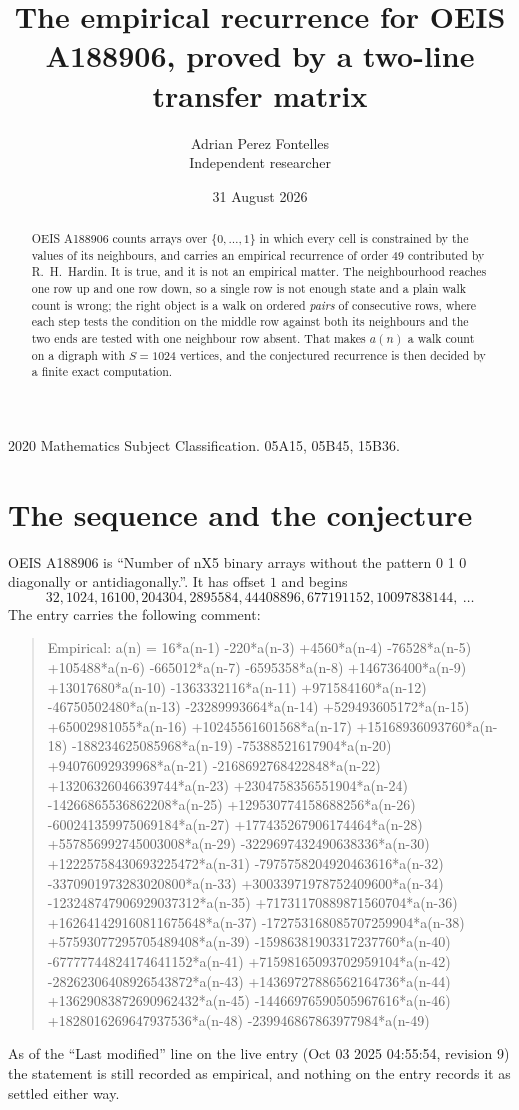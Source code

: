 \documentclass[11pt,a4paper]{article}
\title{The empirical recurrence for OEIS A188906, proved by a two-line transfer matrix}
\author{Adrian Perez Fontelles\\ \small Independent researcher}
\date{31 August 2026}
\theoremstyle{plain}
\theoremstyle{definition}
\begin{document}
\maketitle

\begin{abstract}
OEIS A188906 counts arrays over $\{0,\dots,1\}$ in which every cell is constrained by the
values of its neighbours, and carries an empirical recurrence of order $49$ contributed
by R.~H.~Hardin. It is true, and it is not an empirical matter. The neighbourhood reaches one
row up and one row down, so a single row is not enough state and a plain walk count
is wrong; the right object is a walk on ordered \emph{pairs} of consecutive rows, where
each step tests the condition on the middle row against both its neighbours and the two
ends are tested with one neighbour row absent. That makes $a(n)$ a walk count on a digraph
with $S=1024$ vertices, and the conjectured recurrence is then decided by a finite exact
computation.
\end{abstract}

\noindent\small 2020 Mathematics Subject Classification. 05A15, 05B45, 15B36.\normalsize

\section{The sequence and the conjecture}

OEIS A188906 is ``Number of nX5 binary arrays without the pattern 0 1 0 diagonally or antidiagonally.''. It has offset $1$ and begins
\[
32, 1024, 16100, 204304, 2895584, 44408896, 677191152, 10097838144,\ \dots
\]
The entry carries the following comment:
\begin{quote}\small
Empirical: a(n) = 16*a(n-1) -220*a(n-3) +4560*a(n-4) -76528*a(n-5) +105488*a(n-6) -665012*a(n-7) -6595358*a(n-8) +146736400*a(n-9) +13017680*a(n-10) -1363332116*a(n-11) +971584160*a(n-12) -46750502480*a(n-13) -23289993664*a(n-14) +529493605172*a(n-15) +65002981055*a(n-16) +10245561601568*a(n-17) +15168936093760*a(n-18) -188234625085968*a(n-19) -75388521617904*a(n-20) +94076092939968*a(n-21) -2168692768422848*a(n-22) +13206326046639744*a(n-23) +2304758356551904*a(n-24) -14266865536862208*a(n-25) +129530774158688256*a(n-26) -600241359975069184*a(n-27) +177435267906174464*a(n-28) +557856992745003008*a(n-29) -3229697432490638336*a(n-30) +12225758430693225472*a(n-31) -7975758204920463616*a(n-32) -3370901973283020800*a(n-33) +30033971978752409600*a(n-34) -123248747906929037312*a(n-35) +71731170889871560704*a(n-36) +162641429160811675648*a(n-37) -172753168085707259904*a(n-38) +57593077295705489408*a(n-39) -15986381903317237760*a(n-40) -67777744824174641152*a(n-41) +71598165093702959104*a(n-42) -28262306408926543872*a(n-43) +14369727886562164736*a(n-44) +13629083872690962432*a(n-45) -14466976590505967616*a(n-46) +1828016269647937536*a(n-48) -239946867863977984*a(n-49)
\end{quote}
As of the ``Last modified'' line on the live entry (Oct 03 2025 04:55:54, revision 9) the statement is
still recorded as empirical, and nothing on the entry records it as settled either way.
\end{document}
